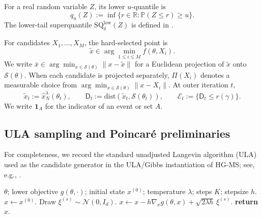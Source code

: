 \documentclass{article}
\theoremstyle{normaltheorem}
\newcommand{\R}{\mathbb{R}}
\newcommand{\calS}{\mathcal{S}}
\begin{document}
\begin{description}[leftmargin=*,style=nextline]
\item[Lower-tail notation.]
For a real random variable \(Z\), its lower \(u\)-quantile is
\[
q_u(Z):=\inf\{r\in\R:\mathbb P(Z\le r)\ge u\}.
\]
The lower-tail superquantile \(\mathrm{SQ}^{\mathrm{low}}_\delta(Z)\) is defined in .

\item[Selected candidates and tube events.]
For candidates \(X_1,\ldots,X_M\), the hard-selected point is
\[
\tilde x\in\arg\min_{1\le i\le M} f(\theta,X_i).
\]
We write \(\bar x\in\arg\min_{x\in\calS(\theta)}\|x-\tilde x\|\) for a Euclidean projection of \(\tilde x\) onto
\(\calS(\theta)\). When each candidate is projected separately, \(\Pi(X_i)\) denotes a measurable choice from
\(\arg\min_{x\in\calS(\theta)}\|x-X_i\|\). At outer iteration \(t\),
\[
\tilde x_t:=\hat{x}_N^\lambda(\theta_t),
\qquad
\mathsf{D}_{t}:=\mathrm{dist}(\tilde x_t,\calS(\theta_t)),
\qquad
\mathcal E_t:=\{\mathsf{D}_{t}\le r(\gamma)\}.
\]
We write \(\mathbf 1_A\) for the indicator of an event or set \(A\).
\end{description}

\subsection{ULA sampling and Poincar\'e preliminaries}\label{append:lmc-ula}
For completeness, we record the standard unadjusted Langevin algorithm (ULA) used as the candidate generator in the
ULA/Gibbs instantiation of \textsc{HG-MS}; see, e.g., \citet{chewi2024analysis}.

\begin{algorithm}[h]
\caption{\textsc{ULA}$(\theta,g,x^{(0)},\lambda,K,h)$}
\label{alg:lmc-ula}
\begin{algorithmic}[1]
\Require $\theta$; lower objective $g(\theta,\cdot)$; initial state $x^{(0)}$;
temperature $\lambda$; steps $K$; stepsize $h$.
\State $x\leftarrow x^{(0)}$.
    \State Draw $\xi^{(s)}\sim\mathcal N(0,I_d)$.
    \State $x\leftarrow x-h\nabla_x g(\theta,x)+\sqrt{2\lambda h}\,\xi^{(s)}$.
\EndFor
\State \textbf{return} $x$.
\end{algorithmic}
\end{algorithm}
\end{document}

